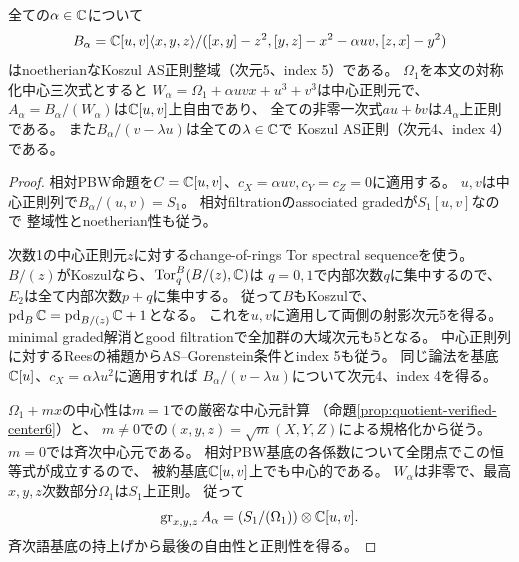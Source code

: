 \begin{corollary}[指定混合族の周囲と中心三次商]
\label{cor:quotient-ambient-pbw}
全ての$\alpha\in\mathbb C$について
\[
 B_\alpha=\mathbb C[u,v]\langle x,y,z\rangle/
 ([x,y]-z^2,[y,z]-x^2-\alpha uv,[z,x]-y^2)
\]
はnoetherianなKoszul AS正則整域（次元5、index 5）である。
$\Omega_1$を本文の対称化中心三次式とすると
$W_\alpha=\Omega_1+\alpha uvx+u^3+v^3$は中心正則元で、
$A_\alpha=B_\alpha/(W_\alpha)$は$\mathbb C[u,v]$上自由であり、
全ての非零一次式$au+bv$は$A_\alpha$上正則である。
また$B_\alpha/(v-\lambda u)$は全ての$\lambda\in\mathbb C$で
Koszul AS正則（次元4、index 4）である。
\end{corollary}
\begin{proof}
相対PBW命題を$C=\mathbb C[u,v]$、$c_X=\alpha uv,c_Y=c_Z=0$に適用する。
$u,v$は中心正則列で$B_\alpha/(u,v)=S_1$。
相対filtrationのassociated gradedが$S_1[u,v]$なので
整域性とnoetherian性も従う。

次数1の中心正則元$z$に対するchange-of-rings Tor spectral sequenceを使う。
$B/(z)$がKoszulなら、$\operatorname{Tor}^B_q(B/(z),\mathbb C)$は
$q=0,1$で内部次数$q$に集中するので、$E_2$は全て内部次数$p+q$に集中する。
従って$B$もKoszulで、$\operatorname{pd}_B\mathbb C=
\operatorname{pd}_{B/(z)}\mathbb C+1$となる。
これを$u,v$に適用して両側の射影次元5を得る。
minimal graded解消とgood filtrationで全加群の大域次元も5となる。
中心正則列に対するReesの補題からAS--Gorenstein条件とindex 5も従う。
同じ論法を基底$\mathbb C[u]$、$c_X=\alpha\lambda u^2$に適用すれば
$B_\alpha/(v-\lambda u)$について次元4、index 4を得る。

$\Omega_1+mx$の中心性は$m=1$での厳密な中心元計算
（命題\ref{prop:quotient-verified-center6}）と、
$m\ne0$での$(x,y,z)=\sqrt m(X,Y,Z)$による規格化から従う。
$m=0$では斉次中心元である。
相対PBW基底の各係数について全閉点でこの恒等式が成立するので、
被約基底$\mathbb C[u,v]$上でも中心的である。
$W_\alpha$は非零で、最高$x,y,z$次数部分$\Omega_1$は$S_1$上正則。
従って
\[
 \operatorname{gr}_{x,y,z}A_\alpha
 =(S_1/(\Omega_1))\otimes\mathbb C[u,v].
\]
斉次語基底の持上げから最後の自由性と正則性を得る。
\end{proof}


